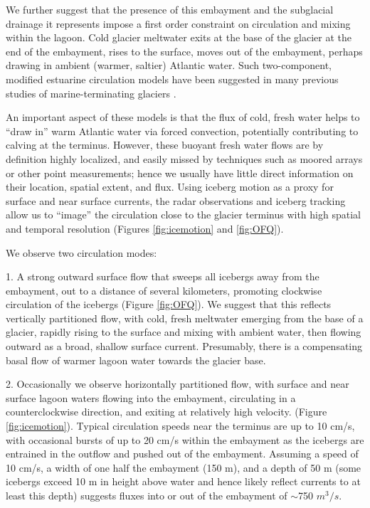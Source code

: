\documentclass[review]{igs}
\begin{document}
We further suggest that the presence of this embayment and the subglacial drainage it represents impose a first order constraint on circulation and mixing within the lagoon. Cold glacier meltwater exits at the base of the glacier at the end of the embayment, rises to the surface, moves out of the embayment, perhaps drawing in ambient (warmer, saltier) Atlantic water.  Such two-component, modified estuarine circulation models have been suggested in many previous studies of marine-terminating glaciers \citep{motyka2003submarine,motyka2011submarine,holland2008acceleration,rignot2010rapid,straneo2010rapid,straneo2012characteristics,mortensen2011heat}. 

 An important aspect of these models is that the flux of cold, fresh water helps to “draw in” warm Atlantic water via forced convection, potentially contributing to calving at the terminus.  However, these buoyant fresh water flows are by definition highly localized, and easily missed by techniques such as moored arrays or other point measurements; hence we usually have little direct information on their location, spatial extent, and flux.  Using iceberg motion as a proxy for surface and near surface currents, the radar observations and iceberg tracking allow us to “image” the circulation close to the glacier terminus with high spatial and temporal resolution (Figures \ref{fig:icemotion} and \ref{fig:OFQ}). 

We observe two circulation modes:

1. A strong outward surface flow that sweeps all icebergs away from the embayment, out to a distance of several kilometers, promoting clockwise circulation of the icebergs (Figure \ref{fig:OFQ}).  We suggest that this reflects vertically partitioned flow, with cold, fresh meltwater emerging from the base of a glacier, rapidly rising to the surface and mixing with ambient water, then flowing outward as a broad, shallow surface current.  Presumably, there is a compensating basal flow of warmer lagoon water towards the glacier base.

2. Occasionally we observe horizontally partitioned flow, with surface and near surface lagoon waters flowing into the embayment, circulating in a counterclockwise direction, and exiting at relatively high velocity. (Figure \ref{fig:icemotion}).  Typical circulation speeds near the terminus are up to 10 cm/s, with occasional bursts of up to 20 cm/s within the embayment as the icebergs are entrained in the outflow and pushed out of the embayment.  Assuming a speed of 10 cm/s, a width of one half the embayment (150 m), and a depth of 50 m (some icebergs exceed 10 m in height above water and hence likely reflect currents to at least this depth) suggests fluxes into or out of the embayment of $\sim$750 $m^3/s$.
\end{document}

